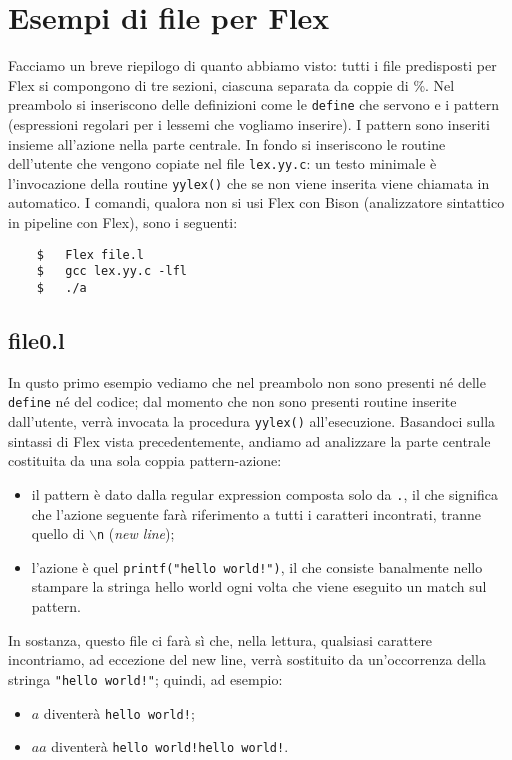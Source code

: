 \documentclass[class=book, crop=false, oneside, 12pt]{standalone}
\begin{document}
\section{Esempi di file per Flex}
Facciamo un breve riepilogo di quanto abbiamo visto: tutti i file predisposti per Flex si compongono di  tre sezioni, ciascuna separata da coppie di \%. Nel preambolo si inseriscono delle definizioni come le \texttt{define} che servono e i pattern (espressioni regolari per i lessemi che vogliamo inserire). I pattern sono inseriti insieme all'azione nella parte centrale. In fondo si inseriscono le routine dell'utente che vengono copiate nel file \texttt{lex.yy.c}: un testo minimale è l'invocazione della routine \texttt{yylex()} che se non viene inserita viene chiamata in automatico. I comandi, qualora non si usi Flex con Bison (analizzatore sintattico in pipeline con Flex), sono i seguenti:
\begin{verbatim}
    $   Flex file.l
    $   gcc lex.yy.c -lfl
    $   ./a
\end{verbatim}

\subsection*{file0.l}

In qusto primo esempio vediamo che nel preambolo non sono presenti né delle \texttt{define} né del codice; dal momento che non sono presenti routine inserite dall'utente, verrà invocata la procedura \texttt{yylex()} all'esecuzione. Basandoci sulla sintassi di Flex vista precedentemente, andiamo ad analizzare la parte centrale costituita da una sola coppia pattern-azione:
\begin{itemize}
    \item il pattern è dato dalla regular expression composta solo da \texttt{.}, il che significa che l'azione seguente farà riferimento a tutti i caratteri incontrati, tranne quello di \texttt{\(\backslash\)n} (\emph{new line});
    \item l'azione è quel \texttt{printf("hello world!")}, il che consiste banalmente nello stampare la stringa hello world ogni volta che viene eseguito un match sul pattern.
\end{itemize}
In sostanza, questo file ci farà sì che, nella lettura, qualsiasi carattere incontriamo, ad eccezione del new line, verrà sostituito da un'occorrenza della stringa \texttt{"hello world!"}; quindi, ad esempio:
\begin{itemize}
    \item \(a\) diventerà \texttt{hello world!};
    \item \(aa\) diventerà \texttt{hello world!hello world!}.
\end{itemize}
\end{document}
